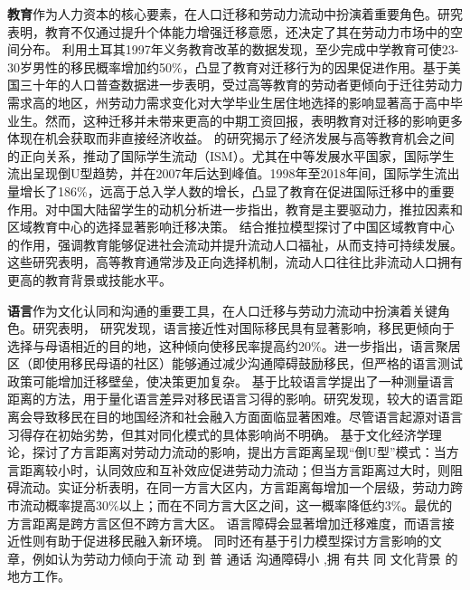 \documentclass[a4paper, zihao=-4, fontset = mac, oneside]{ctexbook} %
\begin{document}
\textbf{教育}作为人力资本的核心要素，在人口迁移和劳动力流动中扮演着重要角色。研究表明，教育不仅通过提升个体能力增强迁移意愿，还决定了其在劳动力市场中的空间分布。
\textcite{aydemirEffectEducationInternal2022}利用土耳其1997年义务教育改革的数据发现，至少完成中学教育可使23-30岁男性的移民概率增加约50\%，凸显了教育对迁移行为的因果促进作用。\textcite{wozniakAreCollegeGraduates2010}基于美国三十年的人口普查数据进一步表明，受过高等教育的劳动者更倾向于迁往劳动力需求高的地区，州劳动力需求变化对大学毕业生居住地选择的影响显著高于高中毕业生。然而，这种迁移并未带来更高的中期工资回报，表明教育对迁移的影响更多体现在机会获取而非直接经济收益。
\textcite{weberStudentMigrationTransition2023}的研究揭示了经济发展与高等教育机会之间的正向关系，推动了国际学生流动（ISM）。尤其在中等发展水平国家，国际学生流出呈现倒U型趋势，并在2007年后达到峰值。1998年至2018年间，国际学生流出量增长了186\%，远高于总入学人数的增长，凸显了教育在促进国际迁移中的重要作用。\textcite{jianiWhyHowInternational2017}对中国大陆留学生的动机分析进一步指出，教育是主要驱动力，推拉因素和区域教育中心的选择显著影响迁移决策。
\textcite{wenEmergenceRegionalEducation2019}结合推拉模型探讨了中国区域教育中心的作用，强调教育能够促进社会流动并提升流动人口福祉，从而支持可持续发展。这些研究表明，高等教育通常涉及正向选择机制，流动人口往往比非流动人口拥有更高的教育背景或技能水平。

\textbf{语言}作为文化认同和沟通的重要工具，在人口迁移与劳动力流动中扮演着关键角色。研究表明，
\textcite{adseraRoleLanguageShaping2015}研究发现，语言接近性对国际移民具有显著影响，移民更倾向于选择与母语相近的目的地，这种倾向使移民率提高约20\%。\textcite{bauerEnclavesLanguageLocation2005}进一步指出，语言聚居区（即使用移民母语的社区）能够通过减少沟通障碍鼓励移民，但严格的语言测试政策可能增加迁移壁垒，使决策更加复杂。
\textcite{isphordingLinguisticBarriersDestination2014}基于比较语言学提出了一种测量语言距离的方法，用于量化语言差异对移民语言习得的影响。研究发现，较大的语言距离会导致移民在目的地国经济和社会融入方面面临显著困难。尽管语言起源对语言习得存在初始劣势，但其对同化模式的具体影响尚不明确。
\textcite{LiuYuYunLaoDongLiKuaFangYanLiuDongDeDaoUXingMoShi2015}基于文化经济学理论，探讨了方言距离对劳动力流动的影响，提出方言距离呈现“倒U型”模式：当方言距离较小时，认同效应和互补效应促进劳动力流动；但当方言距离过大时，则阻碍流动。实证分析表明，在同一方言大区内，方言距离每增加一个层级，劳动力跨市流动概率提高30\%以上；而在不同方言大区之间，这一概率降低约3\%。最优的方言距离是跨方言区但不跨方言大区。
语言障碍会显著增加迁移难度，而语言接近性则有助于促进移民融入新环境。
同时还有基于引力模型探讨方言影响的文章，例如\textcite{LiQinFangYanPuTongHuaYuZhongGuoLaoDongLiQuYuLiuDong2014}认为劳动力倾向于流 动 到 普 通话  沟通障碍小 ,拥 有共 同 文化背景 的 地方工作。
\end{document}
